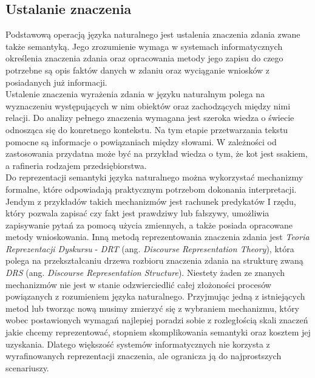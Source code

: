 \subsection{Ustalanie znaczenia}
Podstawową operacją języka naturalnego jest ustalenia znaczenia zdania zwane także semantyką. Jego zrozumienie wymaga w systemach informatycznych określenia znaczenia zdania oraz opracowania metody jego zapisu do czego potrzebne są opis faktów danych w zdaniu oraz wyciąganie wniosków z posiadanych już informacji. \\
Ustalenie znaczenia wyrażenia zdania w języku naturalnym polega na wyznaczeniu występujących w nim obiektów oraz zachodzących między nimi relacji. Do analizy pełnego znaczenia wymagana jest szeroka wiedza o świecie odnosząca się do konretnego kontekstu. Na tym etapie przetwarzania tekstu pomocne są informacje o powiązaniach między słowami. W zależności od zastosowania przydatna może być na przykład wiedza o tym, że kot jest ssakiem, a rafineria rodzajem przedsiębiorstwa. \\
Do reprezentacji semantyki języka naturalnego można wykorzystać mechanizmy formalne, które odpowiadają praktycznym potrzebom dokonania interpretacji. Jendym z przykładów takich mechanizmów jest rachunek predykatów I rzędu, który pozwala zapisać czy fakt jest prawdziwy lub fałszywy, umożliwia zapisywanie pytań za pomocą użycia zmiennych, a także posiada opracowane metody wnioskowania. Inną metodą reprezentowania znaczenia zdania jest \textit{Teoria Reprezentacji Dyskursu} - \textit{DRT} (ang. \textit{Discourse Representation Theory}), która polega na przekształcaniu drzewa rozbioru znaczenia zdania na strukturę zwaną \textit{DRS} (ang. \textit{Discourse Representation Structure}). Niestety żaden ze znanych mechanizmów nie jest w stanie odzwierciedlić całej złożoności procesów powiązanych z rozumieniem języka naturalnego. Przyjmując jedną z istniejących metod lub tworząc nową musimy zmierzyć się z wybraniem mechanizmu, który wobec postawionych wymagań najlepiej poradzi sobie z rozległością skali znaczeń jakie chcemy reprezentować, stopniem skomplikowania semantyki oraz kosztem jej uzyskania. Dlatego większość systemów informatycznych nie korzysta z wyrafinowanych reprezentacji znaczenia, ale ogranicza ją do najprostszych scenariuszy.

